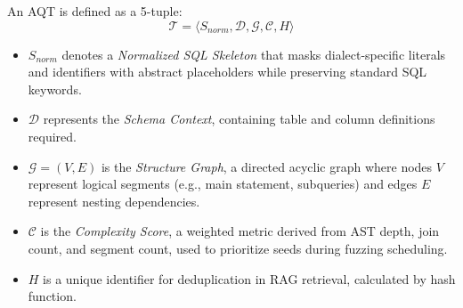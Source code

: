 \documentclass[sigconf,review,anonymous]{acmart}
\begin{document}
\begin{list}{}{\setlength{\leftmargin}{0.5em}}
\item
    \vspace{-0.5cm}
    \begin{definition}  \label{def:aqt}
    An AQT is defined as a 5-tuple:
    $$\mathcal{T} = \langle S_{norm}, \mathcal{D}, \mathcal{G}, \mathcal{C}, H  \rangle$$
    \begin{itemize}
        \item $S_{norm}$ denotes a \textit{Normalized SQL Skeleton} that masks dialect-specific literals and identifiers with abstract placeholders while preserving standard SQL keywords.
        \item $\mathcal{D}$ represents the \textit{Schema Context}, containing table and column definitions required.
        \item $\mathcal{G} = (V, E)$ is the \textit{Structure Graph}, a directed acyclic graph where nodes $V$ represent logical segments (e.g., main statement, subqueries) and edges $E$ represent nesting dependencies. %
        \item $\mathcal{C}$ is the \textit{Complexity Score}, a weighted metric derived from AST depth, join count, and segment count, used to prioritize seeds during fuzzing scheduling.
        \item $H$ is a unique identifier for deduplication in RAG retrieval, calculated by hash function.  
        
    \end{itemize}
    \end{definition}

\end{list}



\end{document}
